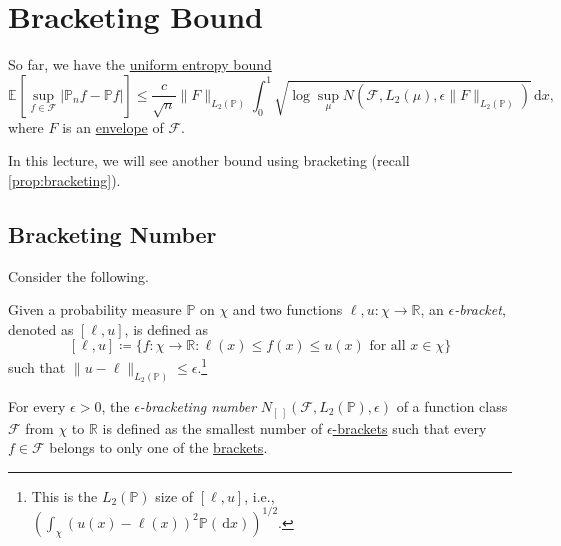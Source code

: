 \section{Bracketing Bound}
\begin{prev}
	So far, we have the \hyperref[thm:uniform-entropy-integral-bound]{uniform entropy bound}
	\[
		\mathbb{E}_{}\left[\sup _{f\in \mathscr{F} } \vert \mathbb{P} _n f - \mathbb{P} f \vert \right]
		\leq \frac{c}{\sqrt{n} } \lVert F \rVert _{L_2(\mathbb{P} )} \int_{0}^{1} \sqrt{\log \sup _\mu N(\mathscr{F} , L_2(\mu ), \epsilon \lVert F \rVert _{L_2(\mathbb{P} )})}  \,\mathrm{d}x,
	\]
	where \(F\) is an \hyperref[def:envelope]{envelope} of \(\mathscr{F} \).
\end{prev}

In this lecture, we will see another bound using bracketing (recall \autoref{prop:bracketing}).

\subsection{Bracketing Number}
Consider the following.

\begin{definition}\label{def:eps-bracket}
	Given a probability measure \(\mathbb{P} \) on \(\chi \) and two functions \(\ell , u\colon \chi \to \mathbb{R} \), an \emph{\(\epsilon \)-bracket}, denoted as \([\ell , u]\), is defined as
	\[
		[\ell , u] \coloneqq \{ f\colon \chi \to \mathbb{R} \colon \ell (x) \leq f(x) \leq u(x) \text{ for all } x\in \chi  \}
	\]
	such that \(\lVert u - \ell \rVert _{L_2(\mathbb{P} )} \leq \epsilon \).\footnote{This is the \(L_2(\mathbb{P} )\) size of \([\ell , u]\), i.e., \(\left( \int _\chi (u(x) - \ell (x))^2 \mathbb{P} (\,\mathrm{d} x) \right) ^{1 / 2}\).}
\end{definition}

\begin{definition}\label{def:bracketing-number}
	For every \(\epsilon > 0\), the \emph{\(\epsilon \)-bracketing number} \(N_{[\ ]}(\mathscr{F} , L_2(\mathbb{P} ), \epsilon )\) of a function class \(\mathscr{F} \) from \(\chi \) to \(\mathbb{R} \) is defined as the smallest number of \hyperref[def:eps-bracket]{\(\epsilon \)-brackets} such that every \(f\in \mathscr{F} \) belongs to only one of the \hyperref[def:eps-bracket]{brackets}.
\end{definition}


